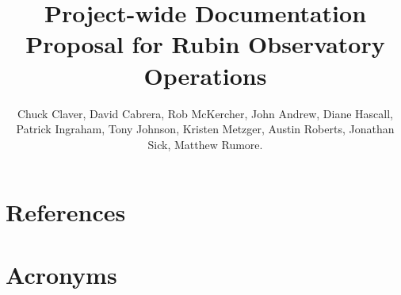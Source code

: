 \documentclass[SE,lsstdraft, authoryear,toc]{lsstdoc}
\title{Project-wide Documentation Proposal for Rubin Observatory Operations}
\author{%
Chuck Claver,
David Cabrera,
Rob McKercher,
John Andrew,
Diane Hascall,
Patrick Ingraham,
Tony Johnson,
Kristen Metzger,
Austin Roberts,
Jonathan Sick,
Matthew Rumore.
}
\date{\vcsDate}
\begin{document}
\maketitle









%






\newpage
\section{References} \label{sec:bib}
\renewcommand{\refname}{} %


\section{Acronyms} \label{sec:acronyms}

\end{document}
